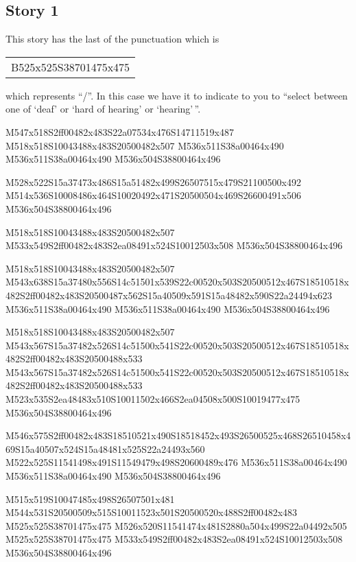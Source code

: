 \documentclass{article}
\begin{document}
\subsection{Story 1}

This story has the last of the punctuation which is \begin{tabular}{c}B525x525S38701475x475\end{tabular} which represents ``/''.
In this case we have it to indicate to you to ``select between one of `deaf' or `hard of hearing' or `hearing'\,''.

\begin{multicols}{5}
\begin{center}
M547x518S2ff00482x483S22a07534x476S14711519x487 %
M518x518S10043488x483S20500482x507 %
M536x511S38a00464x490 %
M536x511S38a00464x490 %
M536x504S38800464x496 %

M528x522S15a37473x486S15a51482x499S26507515x479S21100500x492 %
M514x536S10008486x464S10020492x471S20500504x469S26600491x506 %
M536x504S38800464x496 %

M518x518S10043488x483S20500482x507 %
M533x549S2ff00482x483S2ea08491x524S10012503x508 %
M536x504S38800464x496 %

M518x518S10043488x483S20500482x507 %
M543x638S15a37480x556S14c51501x539S22c00520x503S20500512x467S18510518x482S2ff00482x483S20500487x562S15a40509x591S15a48482x590S22a24494x623 %
M536x511S38a00464x490 %
M536x511S38a00464x490 %
M536x504S38800464x496 %

M518x518S10043488x483S20500482x507 %
M543x567S15a37482x526S14c51500x541S22c00520x503S20500512x467S18510518x482S2ff00482x483S20500488x533 %
M543x567S15a37482x526S14c51500x541S22c00520x503S20500512x467S18510518x482S2ff00482x483S20500488x533 %
M523x535S2ea48483x510S10011502x466S2ea04508x500S10019477x475 %
M536x504S38800464x496 %

M546x575S2ff00482x483S18510521x490S18518452x493S26500525x468S26510458x469S15a40507x524S15a48481x525S22a24493x560 %
M522x525S11541498x491S11549479x498S20600489x476 %
M536x511S38a00464x490 %
M536x511S38a00464x490 %
M536x504S38800464x496 %

M515x519S10047485x498S26507501x481 %
M544x531S20500509x515S10011523x501S20500520x488S2ff00482x483 %
M525x525S38701475x475 %
M526x520S11541474x481S2880a504x499S22a04492x505 %
M525x525S38701475x475 %
M533x549S2ff00482x483S2ea08491x524S10012503x508 %
M536x504S38800464x496 %


\end{center}
\end{multicols}
\end{document}
